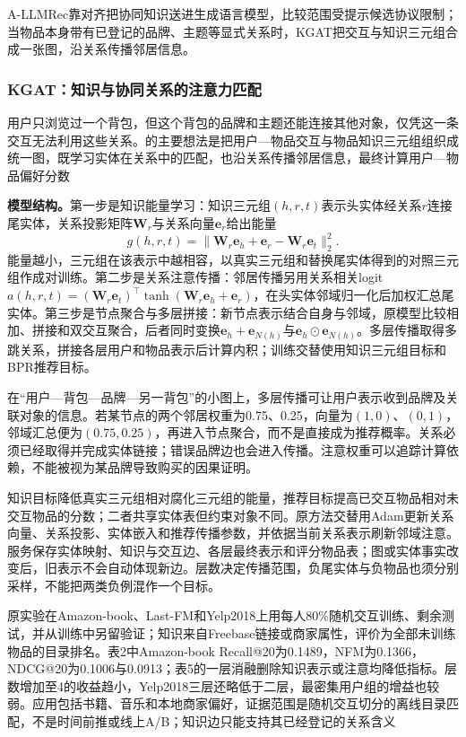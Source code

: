 A-LLMRec靠对齐把协同知识送进生成语言模型，比较范围受提示候选协议限制；当物品本身带有已登记的品牌、主题等显式关系时，KGAT把交互与知识三元组合成一张图，沿关系传播邻居信息。

\subsubsection{KGAT：知识与协同关系的注意力匹配}
\label{sec:rs-kgat}

用户只浏览过一个背包，但这个背包的品牌和主题还能连接其他对象，仅凭这一条交互无法利用这些关系。的主要想法是把用户—物品交互与物品知识三元组组织成统一图，既学习实体在关系中的匹配，也沿关系传播邻居信息，最终计算用户—物品偏好分数

\textbf{模型结构。}第一步是知识能量学习：知识三元组$(h,r,t)$表示头实体经关系$r$连接尾实体，关系投影矩阵$\bm{W}_r$与关系向量$\bm{e}_r$给出能量
\begin{equation}
  g(h,r,t)=\lVert\bm{W}_r\bm{e}_h+\bm{e}_r
                         -\bm{W}_r\bm{e}_t\rVert_2^2.
  \label{eq:rs-kgat-energy}
\end{equation}
能量越小，三元组在该表示中越相容，以真实三元组和替换尾实体得到的对照三元组作成对训练。第二步是关系注意传播：邻居传播另用关系相关logit
$a(h,r,t)=(\bm{W}_r\bm{e}_t)^\top
\tanh(\bm{W}_r\bm{e}_h+\bm{e}_r)$，在头实体邻域归一化后加权汇总尾实体。第三步是节点聚合与多层拼接：新节点表示结合自身与邻域，原模型比较相加、拼接和双交互聚合，后者同时变换$\bm{e}_h+\bm{e}_{N(h)}$与$\bm{e}_h\odot\bm{e}_{N(h)}$。多层传播取得多跳关系，拼接各层用户和物品表示后计算内积；训练交替使用知识三元组目标和BPR推荐目标。

在“用户—背包—品牌—另一背包”的小图上，多层传播可让用户表示收到品牌及关联对象的信息。若某节点的两个邻居权重为0.75、0.25，向量为$(1,0)$、$(0,1)$，邻域汇总便为$(0.75,0.25)$，再进入节点聚合，而不是直接成为推荐概率。关系必须已经取得并完成实体链接；错误品牌边也会进入传播。注意权重可以追踪计算依赖，不能被视为某品牌导致购买的因果证明。

知识目标降低真实三元组相对腐化三元组的能量，推荐目标提高已交互物品相对未交互物品的分数；二者共享实体表但约束对象不同。原方法交替用Adam更新关系向量、关系投影、实体嵌入和推荐传播参数，并依据当前关系表示刷新邻域注意。服务保存实体映射、知识与交互边、各层最终表示和评分物品表；图或实体事实改变后，旧表示不会自动体现新边。层数决定传播范围，负尾实体与负物品也须分别采样，不能把两类负例混作一个目标。

原实验在Amazon-book、Last-FM和Yelp2018上用每人80\%随机交互训练、剩余测试，并从训练中另留验证；知识来自Freebase链接或商家属性，评价为全部未训练物品的目录排名。表2中Amazon-book Recall@20为0.1489，NFM为0.1366，NDCG@20为0.1006与0.0913；表5的一层消融删除知识表示或注意均降低指标。层数增加至4的收益趋小，Yelp2018三层还略低于二层，最密集用户组的增益也较弱。应用包括书籍、音乐和本地商家偏好，证据范围是随机交互切分的离线目录匹配，不是时间前推或线上A/B；知识边只能支持其已经登记的关系含义

